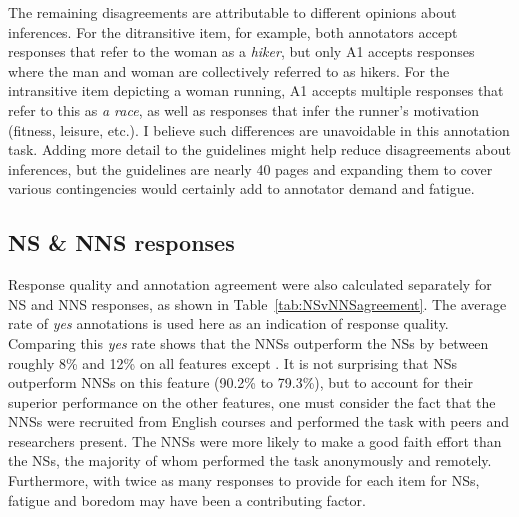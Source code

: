 The remaining disagreements are attributable to different opinions about inferences.  For the ditransitive item, for example, both annotators accept responses that refer to the woman as a \textit{hiker}, but only A1 accepts responses where the man and woman are collectively referred to as hikers. For the intransitive item depicting a woman running, A1 accepts multiple responses that refer to this as \textit{a race}, as well as responses that infer the runner's motivation (fitness, leisure, etc.). I believe such differences are unavoidable in this annotation task. Adding more detail to the guidelines might help reduce disagreements about inferences, but the guidelines are nearly 40 pages and expanding them to cover various contingencies would certainly add to annotator demand and fatigue.

\subsection{NS \& NNS responses}
\label{NSandNNSagreement}
Response quality and annotation agreement were also calculated separately for NS and NNS responses, as shown in Table~\ref{tab:NSvNNSagreement}. The average rate of \textit{yes} annotations is used here as an indication of response quality. Comparing this \textit{yes} rate shows that the NNSs outperform the NSs by between roughly 8\% and 12\% on all features except . It is not surprising that NSs outperform NNSs on this feature (90.2\% to 79.3\%), but to account for their superior performance on the other features, one must consider the fact that the NNSs were recruited from English courses and performed the task with peers and researchers present. The NNSs were more likely to make a good faith effort than the NSs, the majority of whom performed the task anonymously and remotely. Furthermore, 
with twice as many responses to provide for each item for NSs, fatigue and boredom may have been a contributing factor.


